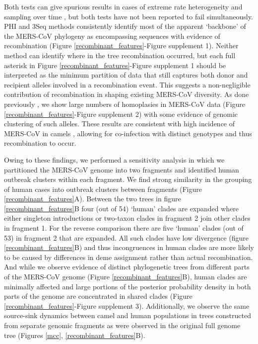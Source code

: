\documentclass[9pt,lineno]{elife}
\begin{document}
Both tests can give spurious results in cases of extreme rate heterogeneity and sampling over time \citep{dudas_mers-cov_2016}, but both tests have not been reported to fail simultaneously.
PHI and 3Seq methods consistently identify most of the apparent `backbone' of the MERS-CoV phylogeny as encompassing sequences with evidence of recombination (Figure \ref{recombinant_features}-Figure supplement 1).
Neither method can identify where in the tree recombination occurred, but each full asterisk in Figure \ref{recombinant_features}-Figure supplement 1 should be interpreted as the minimum partition of data that still captures both donor and recipient alleles involved in a recombination event.
This suggests a non-negligible contribution of recombination in shaping existing MERS-CoV diversity.
As done previously \citep{dudas_mers-cov_2016}, we show large numbers of homoplasies in MERS-CoV data (Figure \ref{recombinant_features}-Figure supplement 2) with some evidence of genomic clustering of such alleles.
These results are consistent with high incidence of MERS-CoV in camels \citep{muller_2014,corman_antibodies_2014,chu_2014,reusken_2014,ali_systematic_2017}, allowing for co-infection with distinct genotypes and thus recombination to occur.

Owing to these findings, we performed a sensitivity analysis in which we partitioned the MERS-CoV genome into two fragments and identified human outbreak clusters within each fragment.
We find strong similarity in the grouping of human cases into outbreak clusters between fragments (Figure \ref{recombinant_features}A).
Between the two trees in figure \ref{recombinant_features}B four (out of 54) `human' clades are expanded where either singleton introductions or two-taxon clades in fragment 2 join other clades in fragment 1.
For the reverse comparison there are five `human' clades (out of 53) in fragment 2 that are expanded.
All such clades have low divergence (figure \ref{recombinant_features}B) and thus incongruences in human clades are more likely to be caused by differences in deme assignment rather than actual recombination.
And while we observe evidence of distinct phylogenetic trees from different parts of the MERS-CoV genome (Figure \ref{recombinant_features}B), human clades are minimally affected and large portions of the posterior probability density in both parts of the genome are concentrated in shared clades (Figure \ref{recombinant_features}-Figure supplement 3).
Additionally, we observe the same source-sink dynamics between camel and human populations in trees constructed from separate genomic fragments as were observed in the original full genome tree (Figures \ref{mcc}, \ref{recombinant_features}B).
\end{document}
